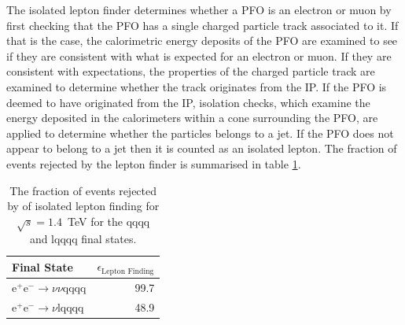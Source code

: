 The isolated lepton finder determines whether a PFO is an electron or muon by first checking that the PFO has a single charged particle track associated to it.  If that is the case, the calorimetric energy deposits of the PFO are examined to see if they are consistent with what is expected for an electron or muon.  If they are consistent with expectations, the properties of the charged particle track are examined to determine whether the track originates from the IP.  If the PFO is deemed to have originated from the IP, isolation checks, which examine the energy deposited in the calorimeters within a cone surrounding the PFO, are applied to determine whether the particles belongs to a jet.  If the PFO does not appear to belong to a jet then it is counted as an isolated lepton.  The fraction of events rejected by the lepton finder is summarised in table \ref{table:efficiencyleptonfinding}.   

\begin{table}[h!]
\centering
\begin{tabular}{ l r }
\hline
Final State & $\epsilon_{\text{Lepton Finding}}$ \\ 
\hline
$\text{e}^{+}\text{e}^{-} \rightarrow \nu{\nu}\text{qqqq}$ & 99.7 \\
$\text{e}^{+}\text{e}^{-} \rightarrow \nu\text{lqqqq}$ & 48.9 \\
\hline
\end{tabular}
\caption[The fraction of events rejected by of isolated lepton finding for $\sqrt{s}=1.4$~TeV for the {\nu}{\nu}qqqq and l{\nu}qqqq final states.]{The fraction of events rejected by of isolated lepton finding for $\sqrt{s}=1.4$~TeV for the {\nu}{\nu}qqqq and l{\nu}qqqq final states.}
\label{table:efficiencyleptonfinding}
\end{table}


